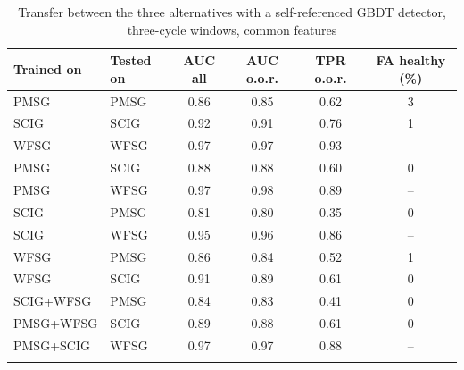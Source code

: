 \begin{table}[t]
\tabsize
\caption{Transfer between the three alternatives with a self-referenced GBDT detector, three-cycle windows, common features}\label{tab:transfer3}
\begin{tabular}{@{}llcccc@{}}
\toprule
Trained on & Tested on & AUC all & AUC o.o.r. & TPR o.o.r. & FA healthy (\%) \\
\midrule
PMSG & PMSG & 0.86 & 0.85 & 0.62 & 3 \\
SCIG & SCIG & 0.92 & 0.91 & 0.76 & 1 \\
WFSG & WFSG & 0.97 & 0.97 & 0.93 & -- \\
PMSG & SCIG & 0.88 & 0.88 & 0.60 & 0 \\
PMSG & WFSG & 0.97 & 0.98 & 0.89 & -- \\
SCIG & PMSG & 0.81 & 0.80 & 0.35 & 0 \\
SCIG & WFSG & 0.95 & 0.96 & 0.86 & -- \\
WFSG & PMSG & 0.86 & 0.84 & 0.52 & 1 \\
WFSG & SCIG & 0.91 & 0.89 & 0.61 & 0 \\
SCIG+WFSG & PMSG & 0.84 & 0.83 & 0.41 & 0 \\
PMSG+WFSG & SCIG & 0.89 & 0.88 & 0.61 & 0 \\
PMSG+SCIG & WFSG & 0.97 & 0.97 & 0.88 & -- \\
\botrule
\end{tabular}
\end{table}
